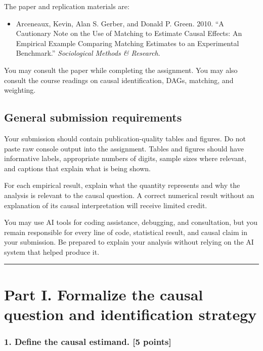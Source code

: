 \documentclass[
]{article}
\providecommand{\tightlist}{%
  \setlength{\itemsep}{0pt}\setlength{\parskip}{0pt}}
\begin{document}
The paper and replication materials are:

\begin{itemize}
\tightlist
\item
  Arceneaux, Kevin, Alan S. Gerber, and Donald P. Green. 2010. ``A
  Cautionary Note on the Use of Matching to Estimate Causal Effects: An
  Empirical Example Comparing Matching Estimates to an Experimental
  Benchmark.'' \emph{Sociological Methods \& Research}.
\end{itemize}

You may consult the paper while completing the assignment. You may also
consult the course readings on causal identification, DAGs, matching,
and weighting.

\subsection{General submission
requirements}\label{general-submission-requirements}

Your submission should contain publication-quality tables and figures.
Do not paste raw console output into the assignment. Tables and figures
should have informative labels, appropriate numbers of digits, sample
sizes where relevant, and captions that explain what is being shown.

For each empirical result, explain what the quantity represents and why
the analysis is relevant to the causal question. A correct numerical
result without an explanation of its causal interpretation will receive
limited credit.

You may use AI tools for coding assistance, debugging, and consultation,
but you remain responsible for every line of code, statistical result,
and causal claim in your submission. Be prepared to explain your
analysis without relying on the AI system that helped produce it.

\begin{center}\rule{0.5\linewidth}{0.5pt}\end{center}

\section{Part I. Formalize the causal question and identification
strategy}\label{part-i.-formalize-the-causal-question-and-identification-strategy}

\subsubsection{1. Define the causal estimand. {[}5
points{]}}\label{define-the-causal-estimand.-5-points}
\end{document}
